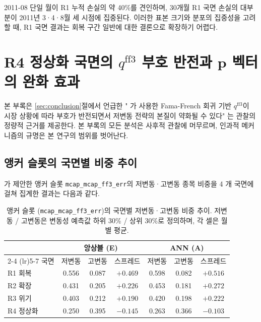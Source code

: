 \documentclass[eng]{kjas3}
\begin{document}
2011-08 단일 월이 R1 누적 손실의 약 40\%를 견인하며, 30개월 R1 국면 손실의 대부분이 2011년 3·4·8월 세 시점에 집중된다. 이러한 표본 크기와 분포의 집중성을 고려할 때, R1 국면 결과는 회복 구간 일반에 대한 결론으로 확장하기 어렵다.

\section{R4 정상화 국면의 $q^{\mathrm{ff3}}$ 부호 반전과 $\mathbf{p}$ 벡터의 완화 효과}\label{app:r4_mechanism}

본 부록은 \ref{sec:conclusion}절에서 언급한 "\citet{pyo2018} 가 사용한 Fama-French 회귀 기반 $q^{\mathrm{ff3}}$이 시장 상황에 따라 부호가 반전되면서 저변동 전략의 본질이 약화될 수 있다" 는 관찰의 정량적 근거를 제공한다. 본 부록의 모든 분석은 사후적 관찰에 머무르며, 인과적 메커니즘의 규명은 본 연구의 범위를 벗어난다.

\subsection{앵커 슬롯의 국면별 비중 추이}

\citet{pyo2018}가 제안한 앵커 슬롯 \texttt{mcap\_mcap\_ff3\_err}의 저변동·고변동 종목 비중을 4 개 국면에 걸쳐 집계한 결과는 다음과 같다.

\begin{table}[t]
\centering
\caption{앵커 슬롯 (\texttt{mcap\_mcap\_ff3\_err})의 국면별 저변동·고변동 비중 추이.
저변동 / 고변동은 변동성 예측값 하위 30\% / 상위 30\%로 정의하며, 각 셀은 월별 평균.}
\label{tab:r4_anchor_weights}
\setlength{\tabcolsep}{8pt}
\renewcommand{\arraystretch}{1.2}
\small
\begin{tabular}{lcccccc}
\toprule
& \multicolumn{3}{c}{앙상블 (E)} & \multicolumn{3}{c}{ANN (A)} \\
\cmidrule(lr){2-4} \cmidrule(lr){5-7}
국면 & 저변동 & 고변동 & 스프레드 & 저변동 & 고변동 & 스프레드 \\
\midrule
R1 회복   & 0.556 & 0.087 & $+0.469$          & 0.598 & 0.082 & $+0.516$          \\
R2 확장   & 0.431 & 0.205 & $+0.226$          & 0.453 & 0.181 & $+0.272$          \\
R3 위기   & 0.403 & 0.212 & $+0.190$          & 0.420 & 0.198 & $+0.222$          \\
R4 정상화 & 0.250 & 0.395 & $\mathbf{-0.145}$ & 0.263 & 0.366 & $\mathbf{-0.103}$ \\
\bottomrule
\end{tabular}
\end{table}
\end{document}
